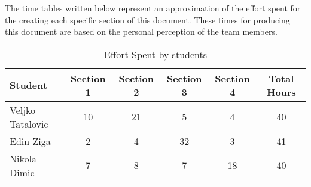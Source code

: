 The time tables written below represent an approximation of the effort spent for the
creating each specific section of this document. These times for producing this document are based on the personal perception of the team members.

\begin{table}[h!]
\centering
\begin{tabular}{|l|c|c|c|c|c|}
\hline
\textbf{Student} & \textbf{Section 1} & \textbf{Section 2} & \textbf{Section 3} & \textbf{Section 4} & \textbf{Total Hours} \\ \hline
Veljko Tatalovic & 10 & 21 & 5 & 4 & 40 \\ \hline
Edin Ziga & 2 & 4 & 32 & 3 & 41 \\ \hline
Nikola Dimic & 7 & 8 & 7 & 18 & 40 \\ \hline
\end{tabular}
\caption{Effort Spent by students}
\label{tab:effort_table}
\end{table}